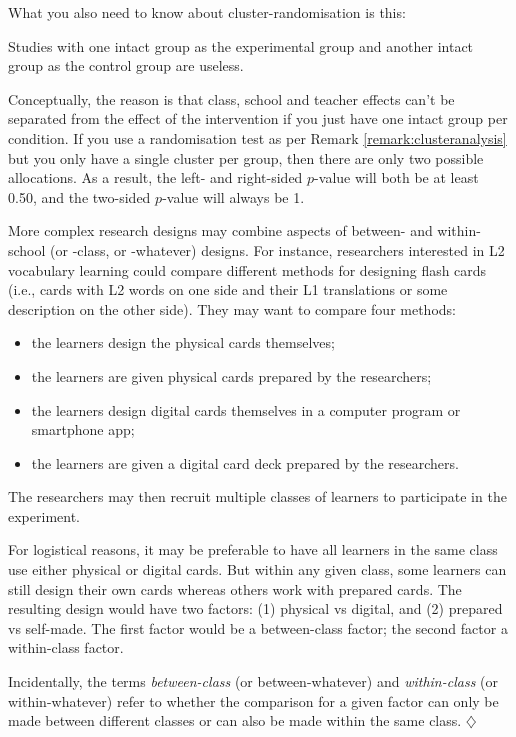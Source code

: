 \documentclass[a4paper]{tufte-book}\usepackage[]{graphicx}\usepackage[]{xcolor}
\newcommand*{\parend}[1][$\diamondsuit$]{%
  \unskip\nobreak\hspace{1em plus 1fill}$\diamondsuit$%
}
\begin{document}
What you also need to know about cluster-randomisation is this:

 \begin{framed}
   Studies with one intact group as the experimental group and another
   intact group as the control group are useless.
 \end{framed}

 Conceptually, the reason is that class, school and teacher effects can't be separated
 from the effect of the intervention if you just have one intact group
 per condition.
 If you use a randomisation test as per Remark \ref{remark:clusteranalysis}
 but you only have a single cluster per group, 
 then there are only two possible allocations.
 As a result, the left- and right-sided $p$-value will both be at least 0.50,
 and the two-sided $p$-value will always be 1.
 
  More complex research designs may combine aspects of between- and within-school
  (or -class, or -whatever) designs.
  For instance, researchers interested in L2 vocabulary learning could compare
  different methods for designing flash cards (i.e., cards with L2 words on one side
  and their L1 translations or some description on the other side).
  They may want to compare four methods:
  \begin{itemize}
    \item the learners design the physical cards themselves;
    \item the learners are given physical cards prepared by the researchers;
    \item the learners design digital cards themselves in a computer program or smartphone app;
    \item the learners are given a digital card deck prepared by the researchers.
  \end{itemize}
  The researchers may then recruit multiple classes of learners to participate
  in the experiment.
  
  For logistical reasons, it may be preferable to have all learners in the same class
  use either physical or digital cards.
  But within any given class, some learners can still design their own cards 
  whereas others work with prepared cards.
  The resulting design would have two factors:
  (1) physical vs digital,
  and (2) prepared vs self-made.
  The first factor would be a between-class factor;
  the second factor a within-class factor.
  
  Incidentally, 
  the terms \textit{between-class} (or between-whatever) 
  and \textit{within-class} (or within-whatever) 
  refer to whether the comparison for a given factor can only be made 
  between different classes or can also be made within the same class.
\parend
\end{document}
